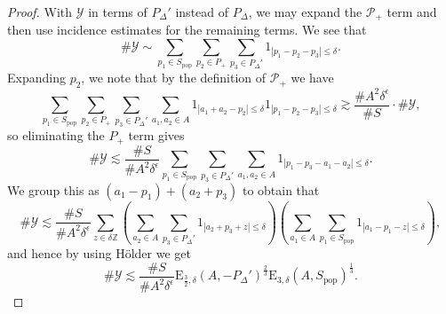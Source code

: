 \documentclass[10pt,a4paper]{amsart}
\begin{document}
\begin{proof}
With \(\mathcal{Y} \) in terms of \(P_{\Delta} '\) instead of \(P_{\Delta} \), we may expand the \(\mathcal{P} _{+} \) term
and then use incidence estimates for the remaining terms.
We see that
\[
	\# \mathcal{Y}  \sim \sum _{p_1 \in S_{\text{pop}}   } \sum _{p_2 \in P_{+} } \sum _{p_3 \in P_{\Delta} ' }  1_{\left\lvert p_1 - p_2 - p_3 \right\rvert \leq \delta}
.\]
Expanding \(p_2\), we note that by the definition of \(\mathcal{P} _{+}  \) we have
\[
	\sum _{p_1 \in S_{\text{pop}} } \sum _{p_2 \in P_{+} } \sum _{p_3 \in P_{\Delta}' } \sum _{a_1,a_2 \in A} 1_{\left\lvert a_1 + a_2 - p_2 \right\rvert \leq \delta} 1_{\left\lvert p_1-p_2-p_3 \right\rvert \leq \delta} \gtrsim \frac{\# A ^{2} \delta^{\epsilon}}{\# S} \cdot \# \mathcal{Y} 
,\]
so eliminating the \(P_{+} \) term gives
\[
	\# \mathcal{Y}  \lesssim \frac{\# S}{\# A ^{2}\delta^{\epsilon}} \sum _{p_1 \in S_{\text{pop}} } \sum _{p_3 \in P_{\Delta}' } \sum _{a_1,a_2 \in A} 1_{\left\lvert p_1-p_3-a_1 - a_2 \right\rvert \leq \delta} 
.\]
We group this as \((a_1 - p_1) + (a_2 + p_3)\) to obtain that
\[
	\# \mathcal{Y}  \lesssim \frac{\# S}{\# A ^{2} \delta^{\epsilon}} 	\sum _{z \in \delta \mathbb{Z} } \left( \sum _{a_2 \in A} \sum _{p_3 \in P_{\Delta}' }  1_{\left\lvert a_2 + p_3 + z \right\rvert \leq \delta}  \right) \left( \sum _{a_1 \in A} \sum _{p_1 \in S _{\text{pop}} 	}  1_{\left\lvert a_1 - p_1 - z \right\rvert \leq \delta} \right) 
,\]
and hence by using H\"older we get
\[
	\# \mathcal{Y}  \lesssim \frac{\# S}{\# A ^{2}\delta^{\epsilon}} \mathrm{E} _{\frac{3}{2} ,\delta} (A,- P_{\Delta}' )^{\frac{2}{3} } \mathrm{E} _{3,\delta} (A, S_{\text{pop}} )^{\frac{1}{3} }
.\]


\end{proof}
\end{document}
